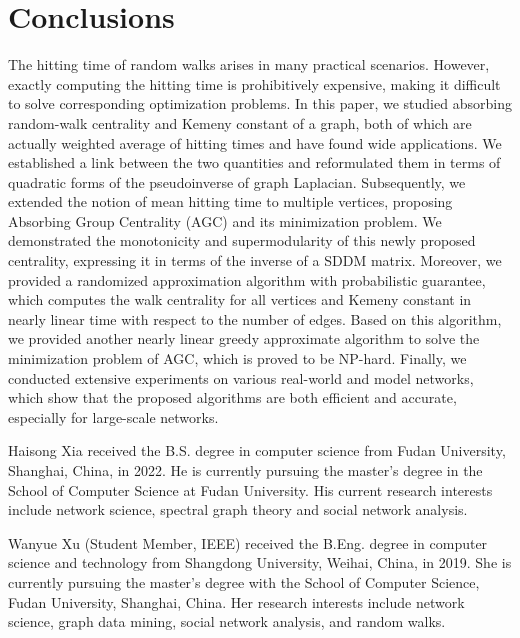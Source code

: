 \documentclass[10pt,twocolumn,twoside]{IEEEtran}
\newcommand{\biophoto}[1]{\texttt{[image: \#1]}}
\begin{document}
\section{Conclusions}

The hitting time of random walks arises in many practical scenarios.
However, exactly computing the hitting time is prohibitively expensive, making it difficult to solve corresponding optimization problems.
In this paper, we studied absorbing random-walk centrality and Kemeny constant of a graph, both of which are actually weighted average of hitting times and have found wide applications.
We established a link between the two quantities and reformulated them in terms of quadratic forms of the pseudoinverse of graph Laplacian.
Subsequently, we extended the notion of mean hitting time to multiple vertices, proposing Absorbing Group Centrality (AGC) and its minimization problem.
We demonstrated the monotonicity and supermodularity of this newly proposed centrality, expressing it in terms of the inverse of a SDDM matrix.
Moreover, we provided a randomized approximation algorithm with probabilistic guarantee, which computes the walk centrality for all vertices and Kemeny constant in nearly linear time with respect to the number of edges.
Based on this algorithm, we provided another nearly linear greedy approximate algorithm to solve the minimization problem of AGC, which is proved to be NP-hard.
Finally, we conducted extensive experiments on various real-world and model networks, which show that the proposed algorithms are both efficient and accurate, especially for large-scale networks.


\balance

\begin{IEEEbiographynophoto}{Haisong Xia}
    received the B.S. degree in computer science from Fudan University, Shanghai, China, in 2022. He is currently pursuing the master's degree in the School of Computer Science at Fudan University.
    His current research interests include network science, spectral graph theory and social network analysis.
\end{IEEEbiographynophoto}

\begin{IEEEbiographynophoto}{Wanyue Xu}
    (Student Member, IEEE) received the B.Eng. degree in computer science and technology from Shangdong University, Weihai, China, in 2019. She is currently pursuing the master's degree with the School of Computer Science, Fudan University, Shanghai, China.
    Her research interests include network science, graph data mining, social network analysis, and random walks.
\end{IEEEbiographynophoto}
\end{document}
